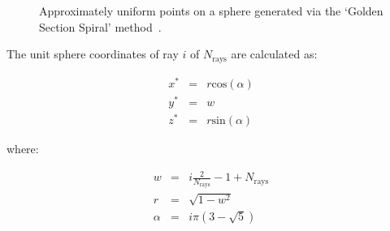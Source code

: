 \begin{figure}[h]
\centering
{} \hspace{0.2cm}
 \hspace{0.2cm}
\caption{Approximately uniform points on a sphere generated via the `Golden Section Spiral' method~\cite{Spiral}.}
\label{fig:gspirals}
\end{figure}

The unit sphere coordinates of ray $i$ of $N_\text{rays}$ are calculated as:

\begin{eqnarray}
 x^\ast &=& r \text{cos}(\alpha) \\
 y^\ast &=& w \\
 z^\ast &=& r \text{sin}(\alpha)
\end{eqnarray}

\noindent where:

\begin{eqnarray}
 w &=& i \frac{2}{N_\text{rays}} - 1 + N_\text{rays} \\
 r &=& \sqrt{ 1 - w^2 } \\
 \alpha &=& i \pi ( 3 - \sqrt{5} )
\end{eqnarray}


